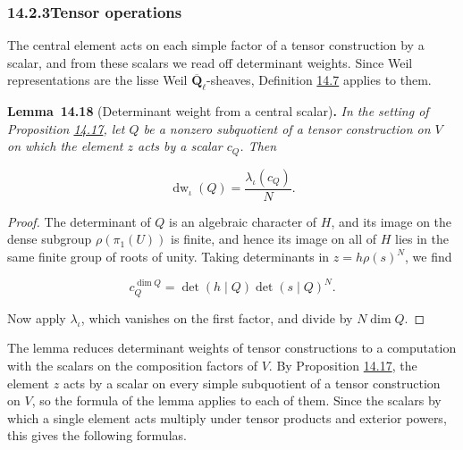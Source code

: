 \documentclass[11pt]{article}
\newenvironment{bpstatement}[2]{\par\addvspace{0.6\baselineskip}\noindent\textbf{#1}#2\textbf{.}\enspace\ignorespaces}
  {\par\addvspace{0.4\baselineskip}}
\newenvironment{bpstatementit}[2]{\begin{bpstatement}{#1}{#2}\itshape\ignorespaces}{\end{bpstatement}}
\begin{document}
\subsubsection*{\texorpdfstring{14.2.3\quad Tensor operations}{14.2.3 Tensor operations}}
\label{bp94}%
\label{bp95}%
The central element acts on each simple factor of a tensor construction by a scalar, and from these scalars we read off determinant weights. Since Weil representations are the lisse Weil \(\overline{\mathbf Q}_\ell\)-sheaves, Definition \hyperref[bp64]{14.7} applies to them.

\label{bp96}%
\begin{bpstatementit}{Lemma~14.18}{ (Determinant weight from a central scalar)}
In the setting of Proposition \hyperref[bp92]{14.17}, let \(Q\) be a nonzero subquotient of a tensor construction on \(V\) on which the element \(z\) acts by a scalar \(c_Q\). Then

\[
\operatorname{dw}_\iota(Q)=\frac{\lambda_\iota(c_Q)}{N}.
\]
\end{bpstatementit}

\begin{proof}[{Proof}]\label{bp97}%
The determinant of \(Q\) is an algebraic character of \(H\), and its image on the dense subgroup \(\rho(\pi_1(U))\) is finite, and hence its image on all of \(H\) lies in the same finite group of roots of unity. Taking determinants in \(z=h\rho(s)^N\), we find

\[
c_Q^{\dim Q}=\det(h\mid Q)\det(s\mid Q)^N.
\]

Now apply \(\lambda_\iota\), which vanishes on the first factor, and divide by \(N\dim Q\).
\end{proof}

\label{bp98}%
The lemma reduces determinant weights of tensor constructions to a computation with the scalars on the composition factors of \(V\). By Proposition \hyperref[bp92]{14.17}, the element \(z\) acts by a scalar on every simple subquotient of a tensor construction on \(V\), so the formula of the lemma applies to each of them. Since the scalars by which a single element acts multiply under tensor products and exterior powers, this gives the following formulas.
\end{document}
